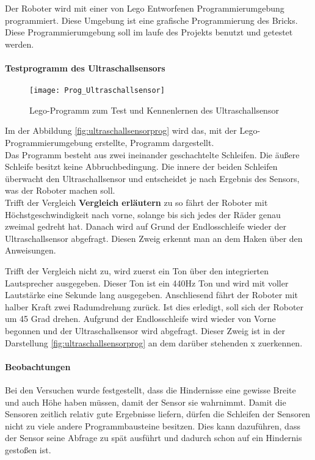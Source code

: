 Der Roboter wird mit einer von Lego Entworfenen Programmierumgebung programmiert. Diese Umgebung ist eine grafische Programmierung des Bricks. Diese Programmierumgebung soll im laufe des Projekts benutzt und getestet werden.

\paragraph{Testprogramm des Ultraschallsensors}
\begin{figure}[htb]
\centering
\texttt{[image: Prog\_Ultraschallsensor]}
\caption{Lego-Programm zum Test und Kennenlernen des Ultraschallsensor}
\label{fig:ultraschallsensorprog}
\end{figure}
Im der Abbildung \vref{fig:ultraschallsensorprog} wird das, mit der Lego- Programmierumgebung erstellte, Programm dargestellt.\\
Das Programm besteht aus zwei ineinander geschachtelte Schleifen. Die äußere Schleife besitzt keine Abbruchbedingung. Die innere der beiden Schleifen überwacht den Ultraschallsensor und entscheidet je nach Ergebnis des Sensors, was der Roboter machen soll.\\
Trifft der Vergleich \textbf{Vergleich erläutern} zu so fährt der Roboter mit Höchstgeschwindigkeit nach vorne, solange bis sich jedes der Räder genau zweimal gedreht hat. Danach wird auf Grund der Endlosschleife wieder der Ultraschallsensor abgefragt. Diesen Zweig erkennt man an dem Haken über den Anweisungen.

Trifft der Vergleich nicht zu, wird zuerst ein Ton über den integrierten Lautsprecher ausgegeben. Dieser Ton ist ein 440Hz Ton und wird mit voller Lautstärke eine Sekunde lang ausgegeben. Anschliesend fährt der Roboter mit halber Kraft zwei Radumdrehung zurück. Ist dies erledigt, soll sich der Roboter um 45 Grad drehen. Aufgrund der Endlosschleife wird wieder von Vorne begonnen und der Ultraschallsensor wird abgefragt. Dieser Zweig ist in der Darstellung \vref{fig:ultraschallsensorprog} an dem darüber stehenden x zuerkennen.
 
\paragraph{Beobachtungen} Bei den Versuchen wurde festgestellt, dass die Hindernisse eine gewisse Breite und auch Höhe haben müssen, damit der Sensor sie wahrnimmt.
Damit die Sensoren zeitlich relativ gute Ergebnisse liefern, dürfen die Schleifen der Sensoren nicht zu viele andere Programmbausteine besitzen. Dies kann dazuführen, dass der Sensor seine Abfrage zu spät ausführt und dadurch schon auf ein Hindernis gestoßen ist.

